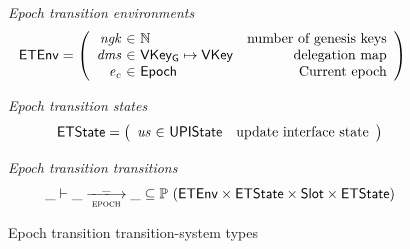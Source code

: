 \documentclass[11pt,a4paper]{article}
\newcommand{\powerset}[1]{\mathbb{P}~#1}
\newcommand{\var}[1]{\mathit{#1}}
\newcommand{\type}[1]{\mathsf{#1}}
\newcommand{\trans}[2]{\xlongrightarrow[\textsc{#1}]{#2}}
\newcommand{\Slot}{\type{Slot}}
\newcommand{\VKey}{\type{VKey}}
\newcommand{\VKeyGen}{\type{VKey_G}}
\begin{document}
\begin{figure}[ht]
  \emph{Epoch transition environments}
  \begin{align*}
    & \ETEnv
      = \left(
      \begin{array}{r@{~\in~}lr}
        \var{ngk} & \mathbb{N} & \text{number of genesis keys}\\
        \var{dms} & \VKeyGen \mapsto \VKey & \text{delegation map}\\
        \var{e_c} & \Epoch & \text{Current epoch}
      \end{array}\right)
  \end{align*}

  \emph{Epoch transition states}
  \begin{equation*}
    \ETState =
    \left(
      \begin{array}{r@{~\in~}lr}
        \var{us} & \UPIState & \text{update interface state}
      \end{array}
    \right)
  \end{equation*}

  \emph{Epoch transition transitions}
  \begin{equation*}
    \_ \vdash \var{\_} \trans{epoch}{\_} \var{\_} \subseteq
    \powerset (\ETEnv \times \ETState \times \Slot \times \ETState)
  \end{equation*}
  \caption{Epoch transition transition-system types}
  \label{fig:ts-types:epoch}
\end{figure}
\end{document}

